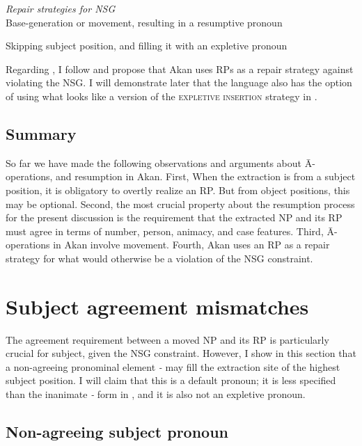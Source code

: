 \documentclass[output=paper]{LSP/langsci}
\begin{document}
  
\ea\label{ex:korsah:14} \textit{Repair strategies for NSG} \citep[see][]{RnS07} \\
\ea\label{ex:korsah:14a}
Base-generation or movement, resulting in a resumptive pronoun

\ex\label{ex:korsah:14b} 
Skipping subject position, and filling it with an expletive pronoun
\z
\z

Regarding , I follow \cite{Shlonsky92} and propose that Akan uses RPs as a repair strategy against violating the NSG. I will demonstrate later that the language also has the option of using what looks like a version of the \textsc{expletive insertion} strategy in .

  
   
\subsection{Summary}\label{sec:korsah:2.4}

So far we have made the following observations and arguments about \=A-opera\-tions, and resumption in Akan. First, When the extraction is from a subject position,  it is obligatory to  overtly realize an RP. But from object positions, this may be optional. Second, the most crucial property about the resumption process for the present discussion is the requirement that the extracted NP and its RP must agree in terms of number, person, animacy, and case features. Third, \=A-operations in Akan involve movement. Fourth, Akan uses an RP  as a repair strategy for what would otherwise be a violation of the NSG constraint.
   
\section{Subject agreement mismatches}\label{sec:korsah:3}
  
The agreement requirement between a moved NP and its RP is particularly crucial for subject, given the NSG constraint. However, I show in this section that a non-agreeing pronominal element \textit{\eer-} may fill the extraction site of the highest subject position. I will claim that this is a default pronoun; it is less specified than the inanimate \textit{\eer-} form in , and it is also not an expletive pronoun.
  
\subsection{Non-agreeing subject pronoun}\label{ex:korsah:3.1}
\end{document}
